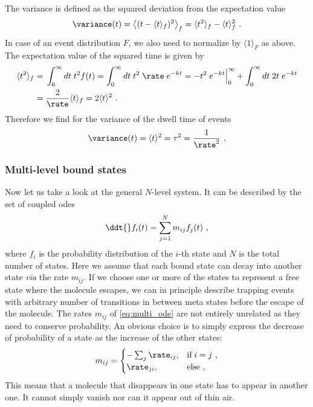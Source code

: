 The variance is defined as the squared deviation from the expectation value
%
\begin{align*}
    \variance(t) = \left\langle (t - \langle t\rangle_f)^2\right\rangle_f
                 = \langle t^2\rangle_f - \langle t\rangle_f^2
    \text{ .}
\end{align*}
%
In case of an event distribution $F$, we also need to normalize by $\langle 1\rangle_F$ as above.  The
expectation value of the squared time is given by
%
\begin{align*}
    \langle t^2\rangle_f ={}& \int_0^\infty dt\; t^2 f(t)
        = \int_0^\infty dt\; t^2 \; \rate\; e^{- kt}
        =  - t^2\; e^{-kt}\Big|_0^\infty + \int_0^\infty dt\; 2t\; e^{-kt}\\
        ={}&  \frac{2}{\rate} \langle t\rangle_f = 2\langle t\rangle^2
        \text{ .}
\end{align*}
%
Therefore we find for the variance of the dwell time of events
%
\begin{align*}
    \variance(t) = \langle t \rangle^2 = \tau^2 = \frac{1}{\rate^2}
    \text{ .}
\end{align*}
%


\subsubsection{Multi-level bound states}
%
\label{sec:trapping_appendix:multi_bound_state}

Now let us take a look at the general $N$-level system. It can be described by the set of coupled \glspl{ode}
%
\begin{align}\label{eq:multi_ode}
    \ddt{} f_i(t) = \sum_{j=1}^N m_{ij} f_j(t)
    \text{ ,}
\end{align}
%
where $f_i$ is the probability distribution of the $i$-th state and $N$ is the total number of states. Here we
assume that each bound state can decay into another state \textit{via} the rate $m_{ij}$. If we choose one or
more of the states to represent a free state where the molecule escapes, we can in principle describe trapping
events with arbitrary number of transitions in between meta states before the escape of the molecule. The
rates $m_{ij}$ of \cref{eq:multi_ode} are not entirely unrelated as they need to conserve probability. An
obvious choice is to simply express the decrease of probability of a state as the increase of the other
states:
%
\begin{align}\label{eq:matrix_elements}
    m_{ij} =
    \begin{cases}
        - \sum_j \rate_{ij}, & \text{if}\; i=j \text{ ,}\\
        \rate_{ji}, & \text{else} \text{ ,}
    \end{cases}
\end{align}
%
This means that a molecule that disappears in one state has to appear in another one. It cannot simply vanish
nor can it appear out of thin air.

